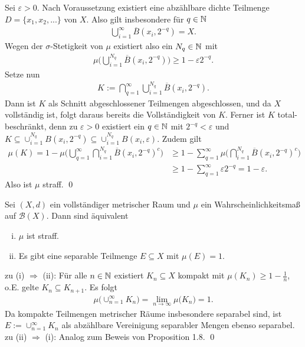 \begin{proof*}
    Sei $\varepsilon > 0$. Nach Voraussetzung existiert eine abzählbare dichte Teilmenge $D = \{x_1, x_2,...\}$ von $X$. Also gilt insbesondere für $q \in \mathbb{N} $
    \begin{align*}
        \bigcup_{i = 1}^{\infty}\overline{B}(x_i, 2^{-q}) = X.
    \end{align*}
    Wegen der $\sigma$-Stetigkeit von $\mu$ existiert also ein $N_q \in \mathbb{N}$ mit 
    \begin{align*}
        \mu\big(\bigcup_{i=1}^{N_q}\overline{B}(x_i, 2^{-q})\big) \geq 1 - \varepsilon 2^{-q}. 
    \end{align*}
    Setze nun 
    \begin{align*}
        K := \bigcap_{q = 1}^{\infty}\bigcup_{i=1}^{N_q}\overline{B}(x_i, 2^{-q}). 
    \end{align*}
    Dann ist $K$ als Schnitt abgeschlossener Teilmengen abgeschlossen, und da $X$ vollständig ist, folgt daraus bereits die Vollständigkeit von $K$. 
    Ferner ist $K$ total-beschränkt, denn zu $\varepsilon > 0$ existiert ein $q \in \mathbb{N}$ mit $2^{-q} < \varepsilon$ und $K \subseteq \cup_{i=1}^{N_q}B(x_i, 2^{-q}) \subseteq \cup_{i=1}^{N_q}B(x_i, \varepsilon)$. 
    Zudem gilt
    \begin{align*}
        \mu(K)  = 1 - \mu\big(\bigcup_{q = 1}^{\infty}\bigcap_{i=1}^{N_q}\overline{B}(x_i, 2^{-q})^c\big) 
                &\geq 1 - \sum_{q=1}^{\infty} \mu\big(\bigcap_{i=1}^{N_q}\overline{B}(x_i, 2^{-q})^c\big) \\\
                &\geq 1 - \sum_{q=1}^{\infty} \varepsilon 2^{-q} = 1 - \varepsilon.
    \end{align*}
    Also ist $\mu$ straff. \qed
\end{proof*}

\begin{proposition}
    Sei $(X,d)$ ein vollständiger metrischer Raum und $\mu$ ein Wahrscheinlichkeitsmaß auf $\mathcal{B}(X)$. Dann sind äquivalent
    \begin{enumerate}[(i)]
        \item $\mu$ ist straff.
        \item Es gibt eine separable Teilmenge $E \subseteq X$ mit $\mu(E) = 1$. 
    \end{enumerate}
\end{proposition}
\begin{proof*}
    zu (i) $\Rightarrow$ (ii): Für alle $n \in \mathbb{N}$ existiert $K_n \subseteq X$ kompakt mit $\mu(K_n) \geq 1 - \frac{1}{n}$, o.E. gelte $K_n \subseteq K_{n+1}$. Es folgt 
    \begin{align*}
        \mu\big(\cup_{n=1}^{\infty}K_n\big) = \lim_{n \to \infty}\mu\big(K_ n\big) = 1. 
    \end{align*}
    Da kompakte Teilmengen metrischer Räume insbesondere separabel sind, ist $E := \cup_{n=1}^{\infty}K_n$ als abzählbare Vereinigung separabler Mengen ebenso separabel. 
    \newline 
    zu (ii) $\Rightarrow$ (i): 
    Analog zum Beweis von Proposition 1.8. \qed
\end{proof*}

